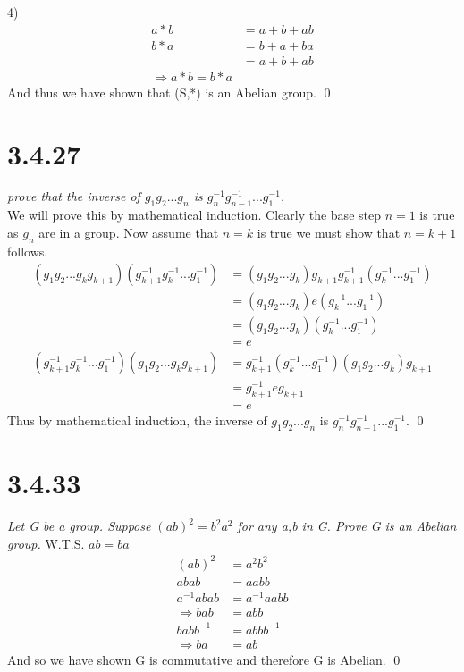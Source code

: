 \documentclass[a4paper, 11pt]{article}
\begin{document}
4)
\begin{align*}
	a \ast b &= a + b +ab \\ 
	b \ast a &= b + a +ba \\ 
	&= a + b +ab \\
	\Rightarrow a \ast b = b \ast a
\end{align*}
And thus we have shown that (S,*) is an Abelian group. \qed

\section*{3.4.27}
\textit{prove that the inverse of $g_1g_2...g_n$ is $g_n^{-1}g_{n-1}^{-1}...g_1^{-1}$.}\\

\noindent We will prove this by mathematical induction. Clearly the base step $n=1$ is true as $g_n$ are in a group. Now assume that $n=k$ is true we must show that $n=k+1$ follows. 
\begin{align*}
	(g_1g_2...g_kg_{k+1})(g_{k+1}^{-1}g_k^{-1}...g_1^{-1}) &=(g_1g_2...g_k)g_{k+1}g_{k+1}^{-1}(g_k^{-1}...g_1^{-1})\\
	&=(g_1g_2...g_k)e(g_k^{-1}...g_1^{-1})\\
	&=(g_1g_2...g_k)(g_k^{-1}...g_1^{-1})\\
	&= e \\
	(g_{k+1}^{-1}g_k^{-1}...g_1^{-1})(g_1g_2...g_kg_{k+1}) &=g_{k+1}^{-1}(g_k^{-1}...g_1^{-1})(g_1g_2...g_k)g_{k+1}\\
	&= g_{k+1}^{-1} e g_{k+1} \\ 
	&= e 
\end{align*}
Thus by mathematical induction, the inverse of $g_1g_2...g_n$ is $g_n^{-1}g_{n-1}^{-1}...g_1^{-1}$. \qed

\section*{3.4.33}
\textit{Let G be a group. Suppose $(ab)^2=b^2a^2$ for any a,b in G. Prove G is an Abelian group.}
W.T.S. $ab = ba$ \\ 
\begin{align*}
	(ab)^2 &= a^2b^2 \\ 
	abab &= aabb \\ 
	a^{-1}abab &= a^{-1}aabb \\ 
	\Rightarrow bab &= abb \\ 
	babb^{-1} &= abbb^{-1} \\ 
	\Rightarrow ba &= ab
\end{align*}
And so we have shown G is commutative and therefore G is Abelian. \qed
\end{document}

